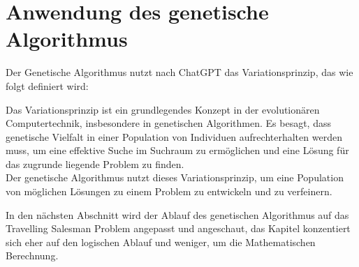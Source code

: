 %
%
%
%
\section{Anwendung des genetische Algorithmus
\label{variationsprinzip_algorithmen:section:genetic_algorithm_process}}
Der Genetische Algorithmus nutzt nach ChatGPT das Variationsprinzip, 
das wie folgt definiert wird:

\begin{displayquote}
Das Variationsprinzip ist ein grundlegendes Konzept in der 
evolutionären Computertechnik, insbesondere in genetischen 
Algorithmen. Es besagt, dass genetische Vielfalt in einer 
Population von Individuen aufrechterhalten werden muss, 
um eine effektive Suche im Suchraum zu ermöglichen und eine 
Lösung für das zugrunde liegende Problem zu finden.
\\
Der genetische Algorithmus nutzt dieses Variationsprinzip, um eine 
Population von möglichen Lösungen zu einem Problem zu entwickeln 
und zu verfeinern.\cite{chatgpt2024}
\end{displayquote}

In den nächsten Abschnitt wird der Ablauf des genetischen Algorithmus 
auf das Travelling Salesman Problem angepasst und angeschaut, das Kapitel
konzentiert sich eher auf den logischen Ablauf und weniger, um die 
Mathematischen Berechnung.









